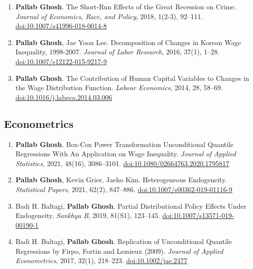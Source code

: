 \documentclass[10.5pt]{article}
\begin{document}
\begin{enumerate}[start=1]
\item \textbf{Pallab Ghosh}. The Short-Run Effects of the Great Recession on Crime. \emph{Journal of Economics, Race, and Policy}, 2018, 1(2-3), 92--111. \href{https://doi.org/10.1007/s41996-018-0014-8}{doi:10.1007/s41996-018-0014-8}
\item \textbf{Pallab Ghosh}, Jae Yoon Lee. Decomposition of Changes in Korean Wage Inequality, 1998-2007. \emph{Journal of Labor Research}, 2016, 37(1), 1--28. \href{https://doi.org/10.1007/s12122-015-9217-9}{doi:10.1007/s12122-015-9217-9}
\item \textbf{Pallab Ghosh}. The Contribution of Human Capital Variables to Changes in the Wage Distribution Function. \emph{Labour Economics}, 2014, 28, 58--69. \href{https://doi.org/10.1016/j.labeco.2014.03.006}{doi:10.1016/j.labeco.2014.03.006}
\end{enumerate}
\subsection{Econometrics}
\begin{enumerate}[start=10]
\item \textbf{Pallab Ghosh}. Box-Cox Power Transformation Unconditional Quantile Regressions With An Application on Wage Inequality. \emph{Journal of Applied Statistics}, 2021, 48(16), 3086--3101. \href{https://doi.org/10.1080/02664763.2020.1795817}{doi:10.1080/02664763.2020.1795817}
\item \textbf{Pallab Ghosh}, Kevin Grier, Jaeho Kim. Heterogeneous Endogeneity. \emph{Statistical Papers}, 2021, 62(2), 847--886. \href{https://doi.org/10.1007/s00362-019-01116-9}{doi:10.1007/s00362-019-01116-9}
\item Badi H. Baltagi, \textbf{Pallab Ghosh}. Partial Distributional Policy Effects Under Endogeneity. \emph{Sankhya B}, 2019, 81(S1), 123--145. \href{https://doi.org/10.1007/s13571-019-00190-1}{doi:10.1007/s13571-019-00190-1}
\item Badi H. Baltagi, \textbf{Pallab Ghosh}. Replication of Unconditional Quantile Regressions by Firpo, Fortin and Lemieux (2009). \emph{Journal of Applied Econometrics}, 2017, 32(1), 218--223. \href{https://doi.org/10.1002/jae.2477}{doi:10.1002/jae.2477}
\end{enumerate}
\end{document}
